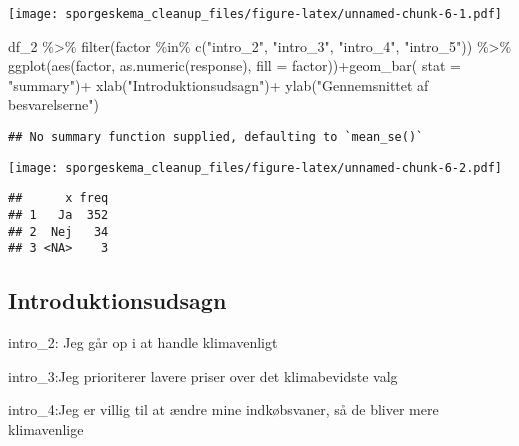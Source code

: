 \documentclass[
]{article}
\newenvironment{Shaded}{\begin{snugshade}}{\end{snugshade}}
\newcommand{\AttributeTok}[1]{\textcolor[rgb]{0.77,0.63,0.00}{#1}}
\newcommand{\FunctionTok}[1]{\textcolor[rgb]{0.00,0.00,0.00}{#1}}
\newcommand{\NormalTok}[1]{#1}
\newcommand{\SpecialCharTok}[1]{\textcolor[rgb]{0.00,0.00,0.00}{#1}}
\newcommand{\StringTok}[1]{\textcolor[rgb]{0.31,0.60,0.02}{#1}}
\begin{document}
\texttt{[image: sporgeskema\_cleanup\_files/figure-latex/unnamed-chunk-6-1.pdf]}

\begin{Shaded}
\begin{Highlighting}[]
\NormalTok{df\_2 }\SpecialCharTok{\%\textgreater{}\%} 
  \FunctionTok{filter}\NormalTok{(factor }\SpecialCharTok{\%in\%} \FunctionTok{c}\NormalTok{(}\StringTok{"intro\_2"}\NormalTok{, }\StringTok{"intro\_3"}\NormalTok{, }\StringTok{"intro\_4"}\NormalTok{, }\StringTok{"intro\_5"}\NormalTok{)) }\SpecialCharTok{\%\textgreater{}\%} 
  \FunctionTok{ggplot}\NormalTok{(}\FunctionTok{aes}\NormalTok{(factor, }\FunctionTok{as.numeric}\NormalTok{(response), }\AttributeTok{fill =}\NormalTok{ factor))}\SpecialCharTok{+}\FunctionTok{geom\_bar}\NormalTok{( }\AttributeTok{stat =} \StringTok{"summary"}\NormalTok{)}\SpecialCharTok{+} 
  \FunctionTok{xlab}\NormalTok{(}\StringTok{"Introduktionsudsagn"}\NormalTok{)}\SpecialCharTok{+} \FunctionTok{ylab}\NormalTok{(}\StringTok{"Gennemsnittet af besvarelserne"}\NormalTok{)}
\end{Highlighting}
\end{Shaded}

\begin{verbatim}
## No summary function supplied, defaulting to `mean_se()`
\end{verbatim}

\texttt{[image: sporgeskema\_cleanup\_files/figure-latex/unnamed-chunk-6-2.pdf]}

\begin{Shaded}
\end{Shaded}

\begin{verbatim}
##      x freq
## 1   Ja  352
## 2  Nej   34
## 3 <NA>    3
\end{verbatim}

\hypertarget{introduktionsudsagn}{%
\subsection{Introduktionsudsagn}\label{introduktionsudsagn}}

intro\_2: Jeg går op i at handle klimavenligt

intro\_3:Jeg prioriterer lavere priser over det klimabevidste valg

intro\_4:Jeg er villig til at ændre mine indkøbsvaner, så de bliver mere
klimavenlige
\end{document}
